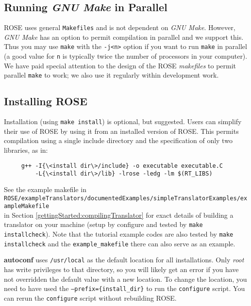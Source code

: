 \subsection{Running {\em GNU Make} in Parallel}
\label{gettingStarted:parallelMake}
     ROSE uses general {\tt Makefiles} and is not dependent on {\em GNU Make}.
     However, {\em GNU Make} has an option to permit compilation in parallel and 
     we support this. Thus you may use {\tt make} with the {\tt -j<n>} option if 
     you want to run {\tt make} in parallel (a good value for {\tt n} is typically 
     twice the number of processors in your computer).  We have paid special 
     attention to the design of the ROSE {\em makefiles} to permit parallel 
     {\tt make} to work; we also use it regularly within development work.

\subsection{Installing ROSE}
\label{gettingStarted:installation}
     Installation (using {\tt make install}) is optional, but suggested. Users can
simplify their use of ROSE by using it from an installed version of ROSE.  This permits
compilation using a single include directory and the specification of only two libraries, 
as in:
\begin{verbatim}
     g++ -I{\<install dir\>/include} -o executable executable.C 
         -L{\<install dir\>/lib} -lrose -ledg -lm $(RT_LIBS)
\end{verbatim}

See the example makefile in \\
{\tt ROSE/exampleTranslators/documentedExamples/simpleTranslatorExamples/exampleMakefile} \\
in Section \ref{gettingStarted:compilingTranslator}
for exact details of building a translator on your machine (setup by configure and tested
by {\tt make installcheck}).  Note that the tutorial example codes are also tested
by {\tt make installcheck} and the {\tt example\_makefile} there can also serve as
an example.

     {\bf autoconf} uses {\tt /usr/local} as the default location for all 
installations. Only {\em root} has write privileges to that directory, so you
will likely get an error if you have not overridden the default value with a new
location.  To change the location, you need to have used the 
{\tt --prefix=\{install\_dir\}} to run the {\tt configure} script.  You can 
rerun the {\tt configure} script without rebuilding ROSE.

